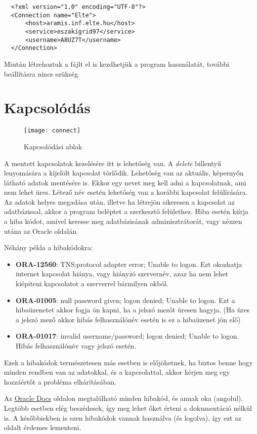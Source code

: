 \begin{lstlisting}
  <?xml version="1.0" encoding="UTF-8"?>
  <Connection name="Elte">
      <host>aramis.inf.elte.hu</host>
      <service>eszakigrid97</service>
      <username>A8UZ7T</username>
  </Connection>
\end{lstlisting}

Miután létrehoztuk a fájlt el is kezdhetjük a program használatát, további beállításra nincs szükség.

\section{Kapcsolódás}
\begin{figure}[ht]
  \texttt{[image: connect]}
 \caption{Kapcsolódási ablak}
\end{figure}
A mentett kapcsolatok kezelésére itt is lehetőség van. A \textit{delete} billentyű lenyomására a kijelölt kapcsolat törlődik.
Lehetőség van az aktuális, képernyőn látható adatok mentésére is. Ekkor egy nevet meg kell adni a kapcsolatnak, ami nem lehet üres.
Létező név esetén lehetőség van a korábbi kapcsolat felülírására.
Az adatok helyes megadása után, illetve ha létrejön sikeresen a kapcsolat az adatbázissal, akkor a program beléptet a szerkesztő felülethez.
Hiba esetén kiírja a hiba kódot, amivel keresse meg adatbázisának adminisztrátorát, vagy nézzen utána az Oracle oldalán.

Néhány példa a hibakódokra:
\begin{itemize}
  \item \textbf{ORA-12560}: TNS:protocol adapter error; Unable to logon. Ezt okozhatja internet kapcsolat hiánya,
  vagy hiányzó szervernév, azaz ha nem lehet kiépíteni kapcsolatot a szerverrel bármilyen okból.
  \item \textbf{ORA-01005}: null password given; logon denied; Unable to logon. Ezt a hibaüzenetet akkor fogja ön kapni,
  ha a jelszó mezőt üresen hagyja. (Ha üres a jelszó mező akkor hibás felhasználónév esetén is ez a hibaüzenet jön elő)
  \item \textbf{ORA-01017}: invalid username/password; logon denied; Unable to logon. Hibás felhasználónév vagy jelszó esetén.
\end{itemize}

Ezek a hibakódok természetesen más esetben is előjöhetnek, ha biztos benne hogy minden rendben van az adatokkal, és a
kapcsolattal, akkor kérjen meg egy hozzáértőt a probléma elhárításában.

Az \href{https://docs.oracle.com/cd/B28359_01/server.111/b28278/toc.htm}{Oracle Docs} oldalon megtalálható minden hibakód, és annak oka (angolul).
Legtöbb esetben elég beszédesek, így meg lehet őket érteni a dokumentáció nélkül is.
A későbbiekben is ezen hibakódok vannak használva (és logolva), így ezt az oldalt érdemes lementeni.

